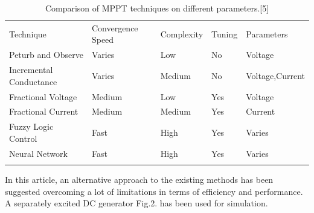 \begin{center}
\begin{table}[hbtp]

\label{Table:1}       %
\caption{Comparison of MPPT techniques on different parameters.[5]}



\begin{tabular}{lllll}
\hline\noalign{\smallskip}

Technique & Convergence Speed & Complexity &Tuning & Parameters  \\
\noalign{\smallskip}\hline\noalign{\smallskip}
Peturb and Observe & Varies & Low &  No & Voltage \\
Incremental Conductance  &  Varies & Medium & No & Voltage,Current \\
Fractional Voltage & Medium & Low & Yes & Voltage \\
Fractional Current & Medium & Medium & Yes & Current \\
Fuzzy Logic Control & Fast & High & Yes & Varies \\
Neural Network & Fast & High & Yes & Varies \\
\noalign{\smallskip}\hline

\end{tabular}
\end{table}
\end{center}
In this article, an alternative approach to the existing methods has been suggested overcoming a lot of limitations in terms of efficiency and performance. A separately excited DC generator Fig.2. has been used for simulation.
